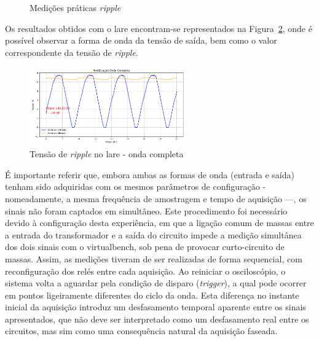 \begin{figure}[hbtp]
	\centering%
		\centering
		\qquad
		\caption{Medições práticas  \textit{ripple}}%
		\label{fig:testesrippleOC}%
	\end{figure}

Os resultados obtidos com o \acrshort{lare} encontram-se representados na Figura~\ref{fig:ripplelareonda}, onde é possível observar a forma de onda da tensão de saída, bem como o valor correspondente da tensão de \textit{ripple}. 

\begin{figure}[hbtp]
	\centering
	\includegraphics[width=0.6\textwidth]{figures/onda-completa.png}
	\caption{Tensão de \textit{ripple} no \acrshort{lare} - onda completa}
	\label{fig:ripplelareonda}
\end{figure}

É importante referir que, embora ambas as formas de onda (entrada e saída) tenham sido adquiridas com os mesmos parâmetros de configuração - nomeadamente, a mesma frequência de amostragem e tempo de aquisição —, os sinais não foram captados em simultâneo. Este procedimento foi necessário devido à configuração desta experiência, em que a ligação comum de massas entre a entrada do transformador e a saída do circuito impede a medição simultânea dos dois sinais com o \acrshort{virtualbench}, sob pena de provocar curto-circuito de massas. Assim, as medições tiveram de ser realizadas de forma sequencial, com reconfiguração dos relés entre cada aquisição. Ao reiniciar o osciloscópio, o sistema volta a aguardar pela condição de disparo (\textit{trigger}), a qual pode ocorrer em pontos ligeiramente diferentes do ciclo da onda. Esta diferença no instante inicial da aquisição introduz um desfasamento temporal aparente entre os sinais apresentados, que não deve ser interpretado como um desfasamento real entre os circuitos, mas sim como uma consequência natural da aquisição faseada.

